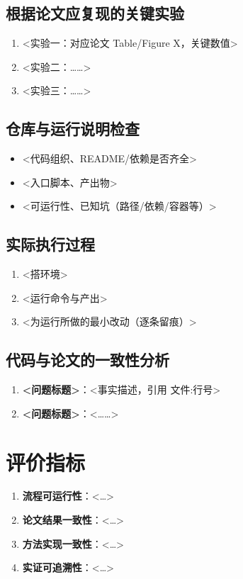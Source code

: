 \documentclass[11pt]{article}
\begin{document}
\subsection{根据论文应复现的关键实验}
\begin{enumerate}[leftmargin=2em]
  \item <实验一：对应论文 Table/Figure X，关键数值>
  \item <实验二：……>
  \item <实验三：……>
\end{enumerate}

\subsection{仓库与运行说明检查}
\begin{itemize}[leftmargin=2em]
  \item <代码组织、README/依赖是否齐全>
  \item <入口脚本、产出物>
  \item <可运行性、已知坑（路径/依赖/容器等）>
\end{itemize}

\subsection{实际执行过程}
\begin{enumerate}[leftmargin=2em]
  \item <搭环境>
  \item <运行命令与产出>
  \item <为运行所做的最小改动（逐条留痕）>
\end{enumerate}

\subsection{代码与论文的一致性分析}
\begin{enumerate}[leftmargin=2em]
  \item \textbf{<问题标题>}：<事实描述，引用 文件:行号>
  \item \textbf{<问题标题>}：<……>
\end{enumerate}

\section{评价指标}
\begin{enumerate}[leftmargin=2em]
  \item \textbf{流程可运行性}：<…>
  \item \textbf{论文结果一致性}：<…>
  \item \textbf{方法实现一致性}：<…>
  \item \textbf{实证可追溯性}：<…>
\end{enumerate}
\end{document}
